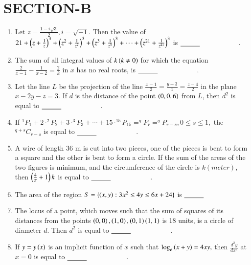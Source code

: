 \documentclass[journal,12pt,onecolumn]{IEEEtran}
\theoremstyle{remark}
\begin{document}
        \section{SECTION-B}
        \begin{enumerate}
		\item Let $z=\frac{1-i\sqrt{3}}{2},i=\sqrt{-1}$. Then the value of $21+\left(z+\frac{1}{z}\right)^{3}+\left(z^{2}+\frac{1}{z^{2}}\right)^{3}+\left(z^{3}+\frac{1}{z^{3}}\right)^{3}+\cdots+\left(z^{21}+\frac{1}{z^{21}}\right)^{3}$ is $\makebox[3cm][l]{\underline{\hspace{1cm}}}.$
        \item  The sum of all integral values of $k\left(k\neq 0\right)$ for which the equation $\frac{2}{x-1}-\frac{1}{x-2}=\frac{2}{k}$ in $x$ has no real roots, is  $\makebox[3cm][l]{\underline{\hspace{1cm}}}$.
        \item Let the line $L$ be the projection of the line $\frac{x-1}{2}=\frac{y-3}{1}=\frac{z-4}{2}$ in the plane $x-2y-z=3$. If $d$ is the distance of the point $\left(0, 0, 6\right)$ from $L$, then $d^{2}$ is equal to $\makebox[3cm][l]{\underline{\hspace{1cm}}}$.
       \item If $^{1}P_{1}+2\cdot^{2}P_{2}+3\cdot^{3}P_{3}+\cdots+15\cdot^{15}P_{15}=^{q}P_{r}=^{q}P_{r-s},0\leq s\leq1,$ the $^{q+s}C_{r-s}$ is equal to $\makebox[3cm][l]{\underline{\hspace{1cm}}}$.
       \item A wire of length 36 m is cut into two pieces, one of the pieces is bent to form a square and the other is bent to form a circle. If the sum of the areas of the two figures is minimum, and the circumference of the circle is $k (meter)$, then $\left(\frac{4}{\pi}+1\right)k$ is equal to $\makebox[3cm][l]{\underline{\hspace{1cm}}}$.
       \item The area of the region $S=\{\left(x,y\right):3x^2 \leq 4y \leq 6x+24\}$ is $\makebox[3cm][l]{\underline{\hspace{1cm}}}$
       \item The locus of a point, which moves such that the sum of squares of its distances from the points $\left(0, 0\right), \left(1, 0\right), \left(0, 1\right) \left(1, 1\right)$ is 18 units, is a circle of diameter $d$. Then $d^2$ is equal to $\makebox[3cm][l]{\underline{\hspace{1cm}}}$.
       \item If $y=y\left(x\right)$ is an implicit function of $x$ such that $\log_{e}\left(x+y\right)=4xy,$ then $\frac{d^2y}{dx^2}$ at $x=0$ is equal to $\makebox[3cm][l]{\underline{\hspace{1cm}}}$.

\end{enumerate}
\end{document}
